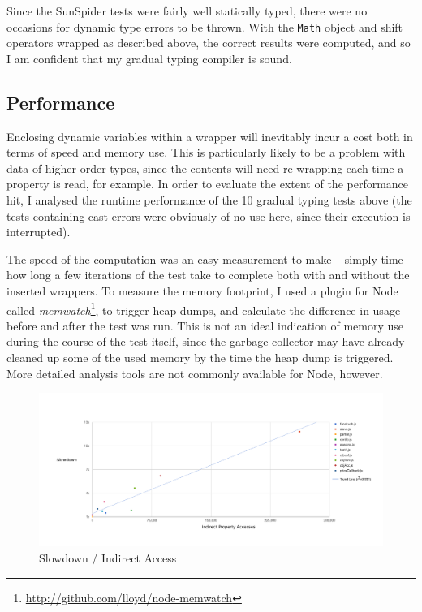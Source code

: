 \documentclass[12pt,a4paper,twoside,openright]{report}
\theoremstyle{definition}
\theoremstyle{dotless}
\newcommand*{\js}{\texttt}
\begin{document}
Since the SunSpider tests were fairly well statically typed, there were no
occasions for dynamic type errors to be thrown. With the \js{Math} object
and shift operators wrapped as described above, the correct results were
computed, and so I am confident that my gradual typing compiler is
sound.

\subsection*{Performance}

Enclosing dynamic variables within a wrapper will inevitably incur a cost both in
terms of speed and memory use. This is particularly likely to be a
problem with data of higher order types, since the contents will need
re-wrapping each time a property is read, for example. In order to evaluate the
extent of the performance hit, I analysed the runtime performance of the 10
gradual typing tests above (the tests containing cast errors were obviously
of no use here, since their execution is interrupted).

The speed of the computation was an easy measurement to make -- simply time how
long a few iterations of the test take to complete both with and without the
inserted wrappers. To measure the memory footprint, I used a plugin for Node
called \textit{memwatch}\footnote{\href{http://github.com/lloyd/node-memwatch}{http://github.com/lloyd/node-memwatch}},
to trigger heap dumps, and calculate the
difference in usage before and after the test was run. This is not an ideal
indication of memory use during the course of the test itself, since the
garbage collector may have already cleaned up some of the used memory by the
time the heap dump is triggered. More detailed analysis tools are not 
commonly available for Node, however.

\begin{figure}
  \parbox[c]{150mm}{\includegraphics[width=150mm]{../res/speed.pdf}}
  \caption{Slowdown / Indirect Access}
  \label{fig:slowdown}
\end{figure}
\end{document}
